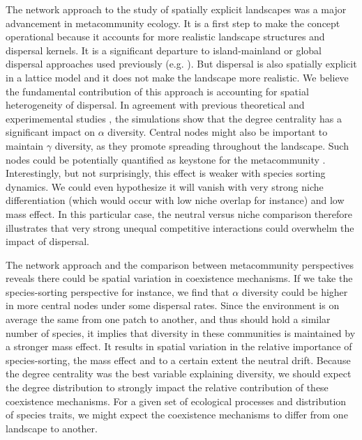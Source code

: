 \documentclass[12pt]{article}
\begin{document}
The network approach to the study of spatially explicit landscapes was a major
advancement in metacommunity ecology. It is a first step to make the concept
operational because it accounts for more realistic landscape structures and
dispersal kernels. It is a significant departure to island-mainland or
global dispersal approaches used previously (e.g. \parencite{Tilman1994a,
Hubbell2001, Mouquet2002}). But dispersal is also spatially explicit in a
lattice model and it does not make the landscape more realistic. We believe the
fundamental contribution of this approach is accounting for spatial
heterogeneity of dispersal. In agreement with previous theoretical
\parencite{Economo2011, Desjardins2012b} and experimemental studies
\parencite{Carrara2012}, the simulations show that the degree centrality has a
significant impact on $\alpha$ diversity. Central nodes might also be important
to maintain $\gamma$ diversity, as they promote spreading
throughout the landscape. Such nodes could be potentially quantified as keystone
for the metacommunity \parencite{Mouquet2013}. Interestingly, but not
surprisingly, this effect is weaker with species sorting dynamics. We could even
hypothesize it will vanish with very strong niche differentiation (which would occur with
low niche overlap for instance) and low mass effect. In this particular case, the
neutral versus niche comparison therefore illustrates that very strong unequal
competitive interactions could overwhelm the impact of dispersal.

The network approach and the comparison between metacommunity perspectives
reveals there could be spatial variation in coexistence mechanisms. If we take
the species-sorting perspective for instance, we find that $\alpha$ diversity
could be higher in more central nodes under some dispersal rates. Since the
environment is on average the same from one patch to another, and thus should
hold a similar number of species, it implies that diversity in these communities
is maintained by a stronger mass effect. It results in spatial variation in the
relative importance of species-sorting, the mass effect and to a certain extent
the neutral drift. Because the degree centrality was the best variable
explaining diversity, we should expect the degree distribution to strongly
impact the relative contribution of these coexistence mechanisms. For a given
set of ecological processes and distribution of species traits, we might expect
the coexistence mechanisms to differ from one landscape to another.
\end{document}
